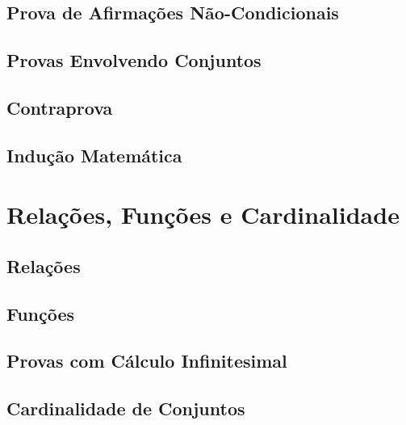 \documentclass[a4paper,11pt,oneside]{book}
\theoremstyle{definition}
\theoremstyle{break}
\begin{document}
\chapter{Prova de Afirmações Não-Condicionais}


\chapter{Provas Envolvendo Conjuntos}


\chapter{Contraprova}


\chapter{Indução Matemática}


\part{Relações, Funções e Cardinalidade}

\chapter{Relações}


\chapter{Funções}


\chapter{Provas com Cálculo Infinitesimal}


\chapter{Cardinalidade de Conjuntos}

\end{document}
